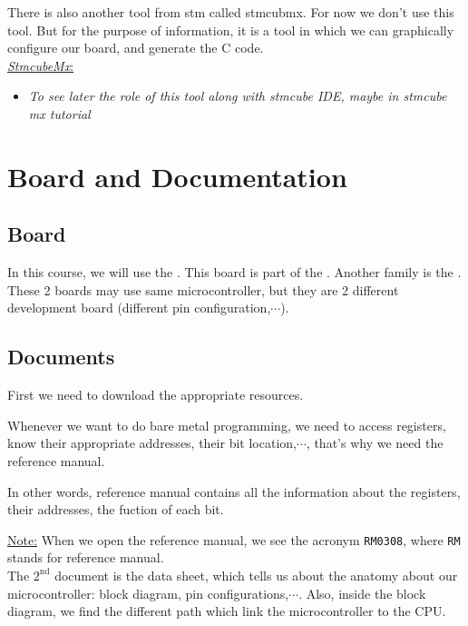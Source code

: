 \documentclass[12pt,a4paper]{book}
\begin{document}
There is also another tool from stm called stmcubmx. For now we don't use this tool. But for the purpose of information, it is a tool in which we can graphically configure our board, and generate the C code.\\

 \underline{\textit{StmcubeMx}:}

\begin{itemize}

\item \textit{To see later the role of this tool along with stmcube IDE, maybe in stmcube mx tutorial}

\end{itemize}


\section{Board and Documentation}

\subsection{Board}

In this course, we will use the . This board is part of the . Another family is the . These 2 boards may use same microcontroller, but they are 2 different development board (different pin configuration,$\cdots$).

\subsection{Documents}

First we need to download the appropriate resources.

Whenever we want to do bare metal programming, we need to access registers, know their appropriate addresses, their bit location,$\cdots$, that's why we need the reference manual.

In other words, reference manual contains all the information about the registers, their addresses, the fuction of each bit.

\underline{Note:} When we open the reference manual, we see the acronym \verb|RM0308|, where \verb|RM| stands for reference manual.\\

The $\mathrm{2}^\mathrm{nd}$ document is the data sheet, which tells us about the anatomy about our microcontroller: block diagram, pin configurations,$\cdots$. Also, inside the block diagram, we find the different path which link the microcontroller to the CPU.\\
\end{document}
